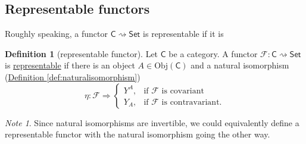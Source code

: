 \documentclass[a4paper,10pt]{scrreprt}
\newcommand{\defn}[1]{\ul{#1}}
\newcommand{\Obj}{\mathrm{Obj}}
\theoremstyle{definition}
\newtheorem{definition}{Definition}[section]
\theoremstyle{plain}
\theoremstyle{remark}
\newtheorem{note}{Note}[section]
\begin{document}
\subsection{Representable functors}
Roughly speaking, a functor $\mathsf{C} \rightsquigarrow \mathsf{Set}$ is representable if it is 

\begin{definition}[representable functor]
  \label{def:representablefunctor}
  Let $\mathsf{C}$ be a category. A functor $\mathcal{F}\colon \mathsf{C} \rightsquigarrow \mathsf{Set}$ is \defn{representable} if there is an object $A \in \Obj(\mathsf{C})$ and a natural isomorphism (\hyperref[def:naturalisomorphism]{Definition \ref*{def:naturalisomorphism}})
  \begin{equation*}
    \eta\colon \mathcal{F} \Rightarrow 
    \begin{cases}
      Y^{A}, & \text{if $\mathcal{F}$ is covariant} \\
      Y_{A}, & \text{if $\mathcal{F}$ is contravariant.}
    \end{cases}
  \end{equation*}
\end{definition}

\begin{note}
  Since natural isomorphisms are invertible, we could equivalently define a representable functor with the natural isomorphism going the other way.
\end{note}
\end{document}
